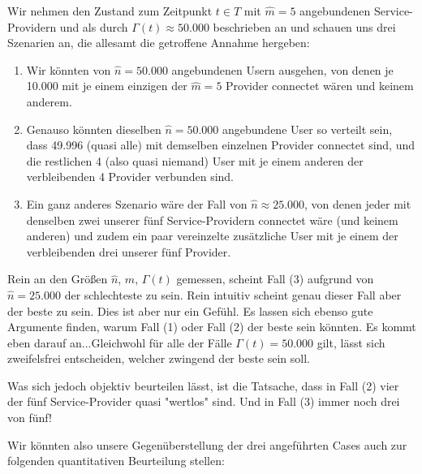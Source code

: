 \begin{Example*}
Wir nehmen den Zustand zum Zeitpunkt $t \in T$ mit $\widehat{m} = 5$ angebundenen Service-Providern und als durch $\Gamma(t) \approx 50.000$ beschrieben an und schauen uns drei Szenarien an, die allesamt die getroffene Annahme hergeben:

\vspace{0.3cm}

\begin{enumerate}
  \item Wir könnten von $\widehat{n} = 50.000$ angebundenen Usern ausgehen, von denen je 10.000 mit je einem einzigen der $\widehat{m} = 5$ Provider connectet wären und keinem anderem. 
  \item Genauso könnten dieselben $\widehat{n} = 50.000$ angebundene User so verteilt sein, dass 49.996 (quasi alle) mit demselben einzelnen Provider connectet sind, und die restlichen 4 (also quasi niemand) User mit je einem anderen der verbleibenden 4 Provider verbunden sind.
  \item Ein ganz anderes Szenario wäre der Fall von $\widehat{n} \approx 25.000$, von denen jeder mit denselben zwei unserer fünf Service-Providern connectet wäre (und keinem anderen) und zudem ein paar vereinzelte zusätzliche User mit je einem der verbleibenden drei unserer fünf Provider.
\end{enumerate}

\vspace{0.3cm}

Rein an den Größen $\widehat{n}$, $\widehat{m}$, $\Gamma(t)$ gemessen, scheint Fall (3) aufgrund von $\widehat{n} = 25.000$ der schlechteste zu sein. Rein intuitiv scheint genau dieser Fall aber der beste zu sein. Dies ist aber nur ein Gefühl. Es lassen sich ebenso gute Argumente finden, warum Fall (1) oder Fall (2) der beste sein könnten. Es kommt eben darauf an...Gleichwohl für alle der Fälle $\Gamma(t) = 50.000$ gilt, lässt sich zweifelsfrei entscheiden, welcher zwingend der beste sein soll.

Was sich jedoch objektiv beurteilen lässt, ist die Tatsache, dass in Fall (2) vier der fünf Service-Provider quasi "wertlos" sind. Und in Fall (3) immer noch drei von fünf!

\vspace{0.3cm}

Wir könnten also unsere Gegenüberstellung der drei angeführten Cases auch zur folgenden quantitativen Beurteilung stellen:

\vspace{0.3cm}


\end{Example*}
